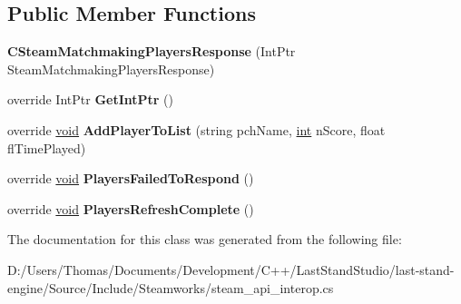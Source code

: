 \subsection*{Public Member Functions}
\begin{DoxyCompactItemize}
\item 
\hypertarget{classValve_1_1Steamworks_1_1CSteamMatchmakingPlayersResponse_ac06725cc9c328019b9215f0d25ac574b}{}{\bfseries C\+Steam\+Matchmaking\+Players\+Response} (Int\+Ptr Steam\+Matchmaking\+Players\+Response)\label{classValve_1_1Steamworks_1_1CSteamMatchmakingPlayersResponse_ac06725cc9c328019b9215f0d25ac574b}

\item 
\hypertarget{classValve_1_1Steamworks_1_1CSteamMatchmakingPlayersResponse_ab55fe10368500b8bee2d96f5159e53ad}{}override Int\+Ptr {\bfseries Get\+Int\+Ptr} ()\label{classValve_1_1Steamworks_1_1CSteamMatchmakingPlayersResponse_ab55fe10368500b8bee2d96f5159e53ad}

\item 
\hypertarget{classValve_1_1Steamworks_1_1CSteamMatchmakingPlayersResponse_a65096b5cc1c1172a8fdcac5245682a5b}{}override \hyperlink{SDL__audio_8h_a52835ae37c4bb905b903cbaf5d04b05f}{void} {\bfseries Add\+Player\+To\+List} (string pch\+Name, \hyperlink{SDL__thread_8h_a6a64f9be4433e4de6e2f2f548cf3c08e}{int} n\+Score, float fl\+Time\+Played)\label{classValve_1_1Steamworks_1_1CSteamMatchmakingPlayersResponse_a65096b5cc1c1172a8fdcac5245682a5b}

\item 
\hypertarget{classValve_1_1Steamworks_1_1CSteamMatchmakingPlayersResponse_a774ff4b30eaa290ae090effa407496f0}{}override \hyperlink{SDL__audio_8h_a52835ae37c4bb905b903cbaf5d04b05f}{void} {\bfseries Players\+Failed\+To\+Respond} ()\label{classValve_1_1Steamworks_1_1CSteamMatchmakingPlayersResponse_a774ff4b30eaa290ae090effa407496f0}

\item 
\hypertarget{classValve_1_1Steamworks_1_1CSteamMatchmakingPlayersResponse_aa27e8a63cd44980317af3cc95ddf8a2d}{}override \hyperlink{SDL__audio_8h_a52835ae37c4bb905b903cbaf5d04b05f}{void} {\bfseries Players\+Refresh\+Complete} ()\label{classValve_1_1Steamworks_1_1CSteamMatchmakingPlayersResponse_aa27e8a63cd44980317af3cc95ddf8a2d}

\end{DoxyCompactItemize}


The documentation for this class was generated from the following file\+:\begin{DoxyCompactItemize}
\item 
D\+:/\+Users/\+Thomas/\+Documents/\+Development/\+C++/\+Last\+Stand\+Studio/last-\/stand-\/engine/\+Source/\+Include/\+Steamworks/steam\+\_\+api\+\_\+interop.\+cs\end{DoxyCompactItemize}

